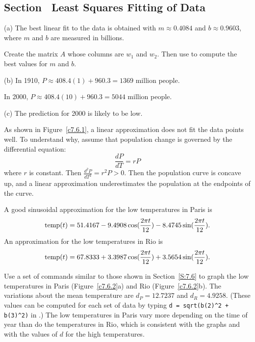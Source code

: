 \newpage
\subsection*{Section~\protect{\ref{S:7.6}} Least Squares Fitting of Data}

(a) \ans The best linear fit to the data is obtained with $m \approx
0.4084$ and $b \approx 0.9603$, where $m$ and $b$ are measured in
billions.

\soln Create the matrix $A$ whose columns are $w_1$ and $w_2$.  Then use
 to compute the best values for $m$ and $b$.

(b) In 1910, $P \approx 408.4(1) + 960.3 = 1369$ million people.

\para In 2000, $P \approx 408.4(10) + 960.3 = 5044$ million people.

(c) \ans The prediction for 2000 is likely to be low.

\soln As shown in Figure~\ref{c7.6.1}, a linear approximation does not
fit the data points well.  To understand why, assume that population
change is governed by the differential equation:
\[
\frac{dP}{dT} = rP
\]
where $r$ is constant.  Then $\frac{d^2P}{dT^2} = r^2P > 0$.
Then the population curve is concave up, and a linear approximation
underestimates the population at the endpoints of the curve.

\begin{figure}[htb]
		\centerline{%
		}
\end{figure}

\ans A good sinusoidal approximation for the low temperatures in Paris
is 
\[ \hbox{temp}(t) = 51.4167 - 9.4908\cos(\frac{2\pi t}{12}) -
8.4745\sin(\frac{2\pi t}{12}). \]
An approximation for the low temperatures in Rio is
\[ \hbox{temp}(t) = 67.8333 + 3.3987\cos(\frac{2\pi t}{12}) +
3.5654\sin(\frac{2\pi t}{12}). \]

\soln Use a set of \Matlab commands similar to those shown in
Section~\ref{S:7.6} to graph the low temperatures in Paris
(Figure~\ref{c7.6.2}a) and Rio (Figure~\ref{c7.6.2}b).  The
variations about the mean temperature are $d_P = 12.7237$ and
$d_R = 4.9258$.  (These values can be computed for each set of data
by typing {\tt d = sqrt(b(2)\^{}2 + b(3)\^{}2)} in \Matlabp.) 
The low temperatures in Paris vary more depending on the time of
year than do the temperatures in Rio, which is consistent with
the graphs and with the values of $d$ for the high temperatures.

